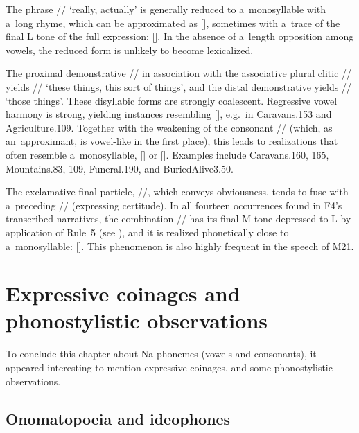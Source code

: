 			
			The phrase // ‘really, actually’ is generally reduced to a~monosyllable with a~long rhyme, which can be approximated as [], sometimes with a~trace of the final L tone of the full
			expression: []. In the absence of a~length opposition among vowels, the reduced form is
			unlikely to become lexicalized.
			
			The proximal demonstrative // in association with the associative plural clitic //
			yields // ‘these things, this sort of things’, and the distal demonstrative yields
			// ‘those things’. These disyllabic forms are strongly coalescent. Regressive vowel
			harmony is strong, yielding instances resembling [], e.g.~in
			Caravans.153 and Agriculture.109. Together with the weakening of the consonant // (which, as an~approximant, is vowel-like in the first place), this leads to realizations that often resemble a~monosyllable, [] or
			[]. Examples include Caravans.160,
			165, Mountains.83, 109, Funeral.190, and BuriedAlive3.50.
			
			The exclamative final particle, //, which conveys obviousness, tends to fuse with
			a~preceding // (expressing certitude). In all fourteen occurrences found in F4’s transcribed narratives, the combination // has its final M tone depressed to L by application of Rule~5 (see ), and it is realized phonetically close to a~monosyllable:
			[]. This phenomenon is also highly frequent in the speech of M21.
			

			\section{Expressive coinages and phonostylistic observations}
			\label{sec:expressivecoinagesandmore}
			

To conclude this chapter about Na phonemes (vowels and consonants), it appeared interesting to mention expressive coinages, and some phonostylistic observations.
			
			\subsection{Onomatopoeia and ideophones}
			\label{sec:onomatopoeics}

